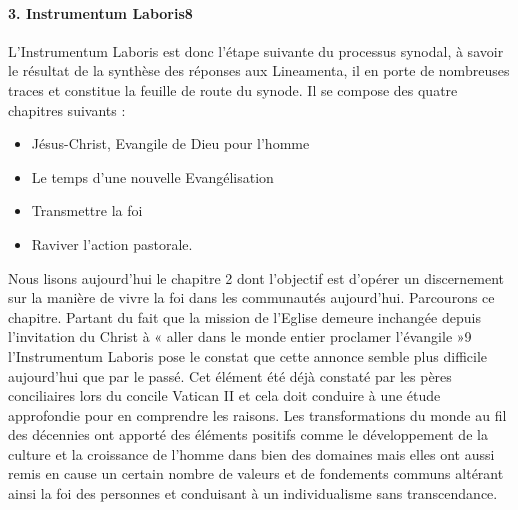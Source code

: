 \paragraph{3. Instrumentum Laboris8}
L’Instrumentum Laboris est donc l’étape suivante du processus synodal, à savoir le résultat de la
synthèse des réponses aux Lineamenta, il en porte de nombreuses traces et constitue la feuille de route
du synode. Il se compose des quatre chapitres suivants : 
\begin{itemize}
    \item Jésus-Christ, Evangile de Dieu pour l’homme
    \item Le temps d’une nouvelle Evangélisation
    \item Transmettre la foi
    \item Raviver l’action pastorale.
\end{itemize}
Nous lisons
aujourd’hui le chapitre 2 dont l’objectif est d’opérer un discernement sur la manière de vivre la foi
dans les communautés aujourd’hui. Parcourons ce chapitre.
Partant du fait que la mission de l’Eglise demeure inchangée depuis l’invitation du Christ à « aller
dans le monde entier proclamer l’évangile »9 l’Instrumentum Laboris pose le constat que cette
annonce semble plus difficile aujourd’hui que par le passé. Cet élément été déjà constaté par les pères
conciliaires lors du concile Vatican II et cela doit conduire à une étude approfondie pour en
comprendre les raisons. Les transformations du monde au fil des décennies ont apporté des éléments
positifs comme le développement de la culture et la croissance de l’homme dans bien des domaines
mais elles ont aussi remis en cause un certain nombre de valeurs et de fondements communs altérant
ainsi la foi des personnes et conduisant à un individualisme sans transcendance.
 
